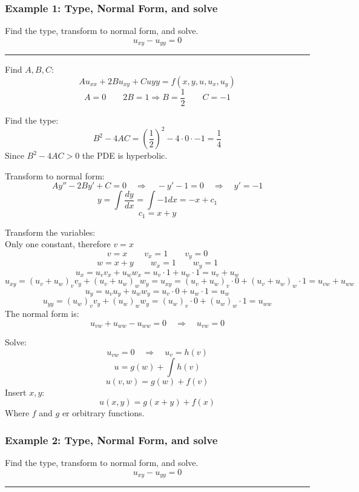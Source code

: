 \subsubsection{Example 1: Type, Normal Form, and solve}
Find the type, transform to normal form, and solve.
$$u_{xy}-u_{yy}=0$$

\rule{\textwidth}{0.5pt}

Find $A,B,C$:
$$Au_{xx}+2Bu_{xy}+Cu{yy}=f(x,y,u,u_x,u_y)$$
$$A=0\qquad 2B=1\Rightarrow B=\frac{1}{2}\qquad C=-1$$

Find the type:
$$B^2-4AC=\left(\frac{1}{2}\right)^2-4\cdot 0\cdot -1=\frac{1}{4}$$
Since $B^2-4AC>0$ the PDE is hyperbolic.

Transform to normal form:
$$Ay''-2By'+C=0\quad\Rightarrow\quad-y'-1=0\quad\Rightarrow\quad y'=-1$$
$$y=\int \frac{dy}{dx}=\int -1dx=-x+c_1$$
$$c_1=x+y$$

Transform the variables:\\
Only one constant, therefore $v=x$
$$v=x\qquad v_x=1\qquad v_y=0$$
$$w=x+y\qquad w_x=1\qquad w_y=1$$
$$u_x=u_v v_x+u_w w_x=u_v \cdot 1+u_w \cdot 1=u_v+u_w$$
$$u_{xy}=(u_v+u_w)_v v_y+(u_v+u_w)_w w_y=u_{xy}=(u_v+u_w)_v \cdot 0+(u_v+u_w)_w \cdot 1=\boxed{u_{vw}+u_{ww}}$$
$$u_y=u_v u_y + u_w w_y=u_v \cdot 0 + u_w \cdot 1=u_w$$
$$u_{yy}=(u_w)_v v_y+(u_w)_w w_y=(u_w)_v \cdot 0+(u_w)_w \cdot 1=\boxed{u_{ww}}$$
The normal form is:
$$u_{vw}+u_{ww}-u_{ww}=0\quad\Rightarrow\quad \boxed{u_{vw}=0}$$

Solve:
$$u_{vw}=0\quad\Rightarrow\quad u_v=h(v)$$
$$u=g(w)+\int h(v)$$
$$u(v,w)=g(w)+f(v)$$
Insert $x,y$:
$$u(x,y)=g(x+y)+f(x)$$
Where $f$ and $g$ er orbitrary functions.

\subsubsection{Example 2: Type, Normal Form, and solve}
Find the type, transform to normal form, and solve.
$$u_{xy}-u_{yy}=0$$

\rule{\textwidth}{0.5pt}
